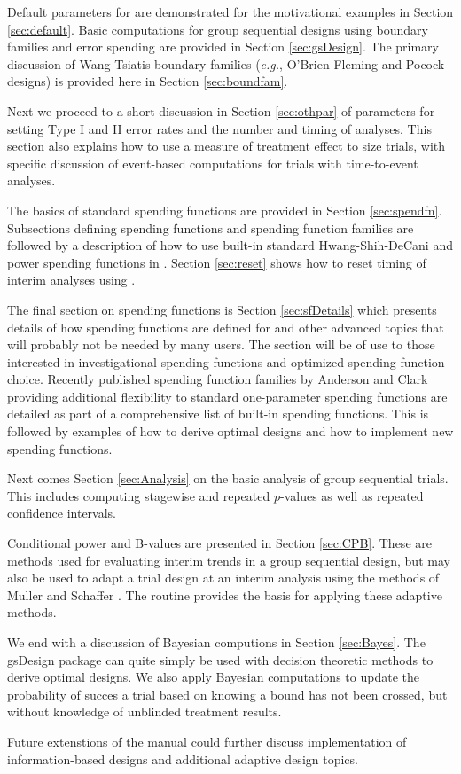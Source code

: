 Default parameters for  are demonstrated for the motivational examples in Section \ref{sec:default}.
Basic computations for group sequential designs using boundary families and error spending are provided in Section \ref{sec:gsDesign}. The primary discussion of Wang-Tsiatis \cite{WangTsiatis} boundary families ({\it e.g.}, O'Brien-Fleming \cite{OF} and Pocock \cite{PocockBound} designs) is provided here in Section \ref{sec:boundfam}. 

Next we proceed to a short discussion in Section \ref{sec:othpar} of  parameters for setting Type I and II error rates and the number and timing of analyses.
This section also explains how to use a measure of treatment effect to size trials, with specific discussion of event-based computations for trials with time-to-event analyses.

The basics of standard spending functions are provided in Section \ref{sec:spendfn}.
Subsections defining spending functions and spending function families are followed by a description of how to use built-in standard Hwang-Shih-DeCani \cite{HwangShihDeCani} and power \cite{KimDeMets} spending functions in .
Section \ref{sec:reset} shows how to reset timing of interim analyses using .

The final section on spending functions is Section \ref{sec:sfDetails} which presents details of how spending functions are defined for  and other advanced topics that will probably not be needed by many users.
The section will be of use to those interested in investigational spending functions and optimized spending function choice. 
Recently published spending function families by Anderson and Clark \cite{AndClark} providing additional flexibility to standard one-parameter spending functions are detailed as part of a comprehensive list of built-in  
spending functions. 
This is followed by examples of how to derive optimal designs and how to implement new spending functions.

Next comes Section \ref{sec:Analysis} on the basic analysis of group sequential trials. 
This includes computing stagewise and repeated $p$-values as well as repeated confidence intervals.

Conditional power and B-values are presented in Section \ref{sec:CPB}.
These are methods used for evaluating interim trends in a group sequential design, but may also be used to adapt a trial design at an interim analysis using the methods of  Muller and Schaffer \cite{MullerSchafer01}. 
The routine  provides the basis for applying these adaptive methods.

We end with a discussion of Bayesian computions in Section \ref{sec:Bayes}.
The gsDesign package can quite simply be used with decision theoretic methods to derive optimal designs. We also apply Bayesian computations to update the probability of succes a trial based on knowing a bound has not been crossed, but without knowledge of unblinded treatment results. 

Future extenstions of the manual could further discuss implementation of information-based designs and additional adaptive design topics. 

